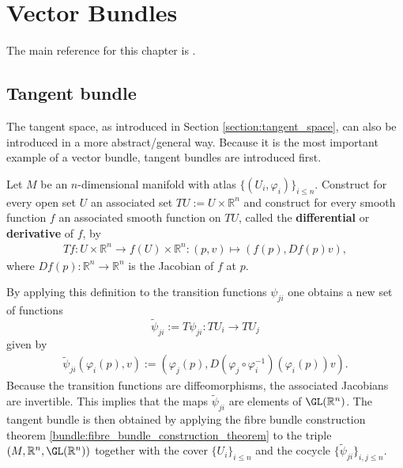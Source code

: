 \chapter{Vector Bundles}\label{chapter:vector_bundles}

    The main reference for this chapter is \cite{bott_tu}.

\section{Tangent bundle}

    The tangent space, as introduced in Section \ref{section:tangent_space}, can also be introduced in a more abstract/general way. Because it is the most important example of a vector bundle, tangent bundles are introduced first.
    \begin{construct}
        Let $M$ be an $n$-dimensional manifold with atlas $\{(U_i,\varphi_i)\}_{i\leq n}$. Construct for every open set $U$ an associated set $TU := U\times\mathbb{R}^n$ and construct for every smooth function $f$ an associated smooth function on $TU$, called the \textbf{differential} or \textbf{derivative} of $f$, by
        \begin{gather}
            \label{bundle:T_function}
            Tf:U\times\mathbb{R}^n\rightarrow f(U)\times\mathbb{R}^n:(p,v)\mapsto(f(p),Df(p)v),
        \end{gather}
        where $Df(p):\mathbb{R}^n\rightarrow\mathbb{R}^n$ is the Jacobian of $f$ at $p$.

        By applying this definition to the transition functions $\psi_{ji}$ one obtains a new set of functions \[\widetilde{\psi}_{ji}:=T\psi_{ji}:TU_i\rightarrow TU_j\] given by
        \begin{gather}
            \widetilde{\psi}_{ji}(\varphi_i(p),v) := \left(\varphi_j(p), D(\varphi_j\circ\varphi_i^{-1})(\varphi_i(p))v\right).
        \end{gather}
        Because the transition functions are diffeomorphisms, the associated Jacobians are invertible. This implies that the maps $\widetilde\psi_{ji}$ are elements of $\GL(\mathbb{R}^n)$. The tangent bundle is then obtained by applying the fibre bundle construction theorem \ref{bundle:fibre_bundle_construction_theorem} to the triple $(M,\mathbb{R}^n,\GL(\mathbb{R}^n))$ together with the cover $\{U_i\}_{i\leq n}$ and the cocycle $\{\widetilde\psi_{ji}\}_{i,j\leq n}$.
    \end{construct}

